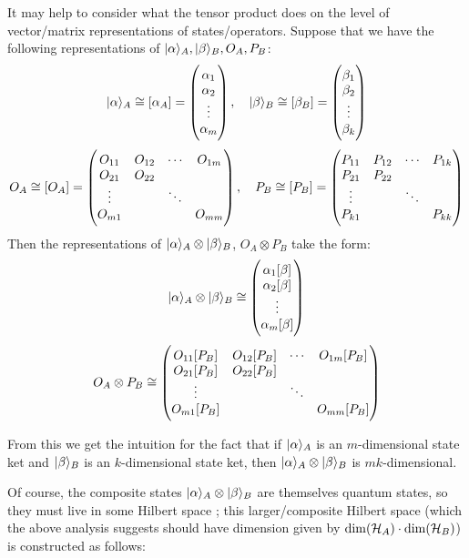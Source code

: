 It may help to consider what the tensor product does on the level of vector/matrix representations of states/operators. Suppose that we have the following representations of $\lvert \alpha \rangle_A, \lvert \beta \rangle_B, O_A, P_B$:
\begin{equation}
    \lvert \alpha \rangle_A \cong [\alpha_A] = \begin{pmatrix}\alpha_1 \\ \alpha_2 \\ \vdots \\ \alpha_m\end{pmatrix}, \quad \lvert \beta \rangle_B \cong [\beta_B] = \begin{pmatrix}\beta_1 \\ \beta_2 \\ \vdots \\ \beta_k\end{pmatrix}
\end{equation}
\begin{equation}
    O_A \cong [O_A] = \begin{pmatrix}O_{11} & O_{12} & \cdots & O_{1m} \\ O_{21} & O_{22} & & \\ \vdots & & \ddots & \\ O_{m1} & & & O_{mm}\end{pmatrix}, \quad P_B \cong [P_B] = \begin{pmatrix}P_{11} & P_{12} & \cdots & P_{1k} \\ P_{21} & P_{22} & & \\ \vdots & & \ddots & \\ P_{k1} & & & P_{kk}\end{pmatrix}
\end{equation}
Then the representations of $\lvert \alpha \rangle_A \otimes \lvert \beta \rangle_B$, $O_A \otimes P_B$ take the form:
\begin{equation}
    \lvert \alpha \rangle_A \otimes \lvert \beta \rangle_B \cong \begin{pmatrix}\alpha_1[\beta] \\ \alpha_2[\beta] \\ \vdots \\ \alpha_{m}[\beta]\end{pmatrix}
\end{equation}
\begin{equation}
    O_A \otimes P_B \cong \begin{pmatrix}O_{11}[P_B] & O_{12}[P_B] & \cdots & O_{1m}[P_B] \\ O_{21}[P_B] & O_{22}[P_B] & & \\ \vdots & & \ddots & \\ O_{m1}[P_B] & & & O_{mm}[P_B]\end{pmatrix}
\end{equation}

From this we get the intuition for the fact that if $\lvert \alpha \rangle_A$ is an $m$-dimensional state ket and $\lvert \beta \rangle_B$ is an $k$-dimensional state ket, then $\lvert \alpha \rangle_A \otimes \lvert \beta \rangle_B$ is $mk$-dimensional. 

Of course, the composite states $\lvert \alpha \rangle_A \otimes \lvert \beta \rangle_B$ are themselves quantum states, so they must live in some Hilbert space ; this larger/composite Hilbert space (which the above analysis suggests should have dimension given by $\dim(\mathcal{H}_A) \cdot \dim(\mathcal{H}_B)$) is constructed as follows:

